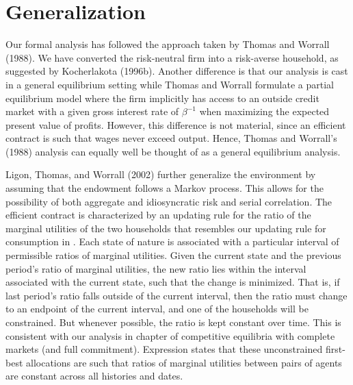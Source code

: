 \section{Generalization}\label{LTW2002}%
Our formal analysis has followed the approach taken by Thomas and
Worrall (1988). We have converted the risk-neutral firm
into a risk-averse household, as suggested by Kocherlakota (1996b).
Another difference is that our analysis is cast in a general
equilibrium setting while Thomas and Worrall formulate a partial
equilibrium model where the firm  implicitly has access
to an outside credit market with a given gross interest rate
of $\beta^{-1}$ when maximizing the expected present value of
profits. However, this difference is not material, since
an efficient contract is such that wages never exceed
output.
Hence, Thomas and Worrall's (1988)
analysis can equally well be thought of as a general equilibrium
analysis.

Ligon, Thomas, and Worrall (2002) further generalize the environment
by assuming that the endowment follows a Markov process.
This allows for the possibility of both aggregate and idiosyncratic
risk and serial correlation. The efficient contract is characterized
by an updating rule for the ratio of the marginal utilities of the
two households that resembles our updating rule for consumption
in . Each state of nature is associated with a particular
interval of permissible ratios of marginal utilities. Given the current
state and the previous period's ratio of marginal utilities, the new
ratio lies within the interval associated with the current state, such
that the change is minimized. That is, if last period's ratio falls
outside of the current interval, then the ratio must
change to an endpoint of the current interval, and one of the
households will be constrained. But whenever possible, the ratio is
kept constant over time. This is consistent with
our analysis in chapter  of competitive equilibria with complete
markets (and full commitment). Expression 
states that these unconstrained first-best allocations are such that
ratios of marginal utilities between pairs of agents are constant
across all histories and dates.



